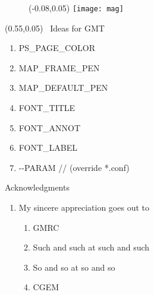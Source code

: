 \documentclass[light]{cgem-presentation}
\begin{document}
  \begin{frame}
    \begin{figure}
      \begin{textblock*}{0.7\paperwidth}(-0.08\paperwidth,0.05\paperheight)
        \texttt{[image: mag]}
      \end{textblock*}
    \end{figure}
    \begin{textblock*}{0.5\paperwidth}(0.55\paperwidth,0.05\paperheight)
      \Huge
      \,\,\,Ideas for GMT
      \begin{enumerate}
        \item PS\_PAGE\_COLOR
        \item MAP\_FRAME\_PEN
        \item MAP\_DEFAULT\_PEN
        \item FONT\_TITLE
        \item FONT\_ANNOT
        \item FONT\_LABEL
        \item -\hspace{0.1mm}-PARAM //
          (override *.conf)
      \end{enumerate}
    \end{textblock*}

  \end{frame}

  \begin{frame}{Acknowledgments}
    \vspace{-2cm}
    \begin{enumerate}
      \item My sincere appreciation goes out to
      \begin{enumerate}
        \item GMRC
        \item Such and such at such and such
        \item So and so at so and so
        \item CGEM 
      \end{enumerate}
    \end{enumerate}
  \end{frame}
\end{document}
